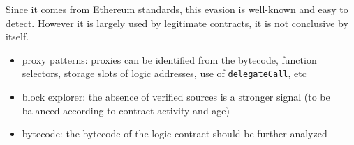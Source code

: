 Since it comes from Ethereum standards, this evasion is well-known and easy to detect.
However it is largely used by legitimate contracts, it is not conclusive by itself.

\begin{itemize}
\item{proxy patterns: proxies can be identified from the bytecode, function selectors, storage slots of logic addresses, use of \lstinline{delegateCall}, etc}
\item{block explorer: the absence of verified sources is a stronger signal (to be balanced according to contract activity and age)}
\item{bytecode: the bytecode of the logic contract should be further analyzed}
\end{itemize}
